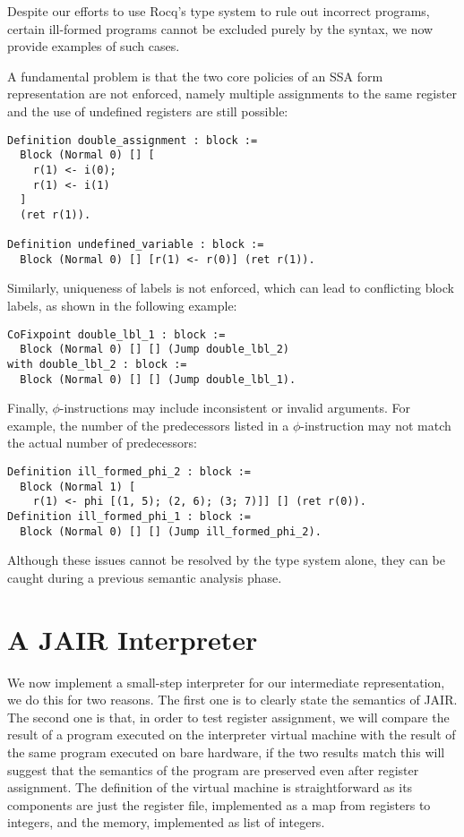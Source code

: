 Despite our efforts to use Rocq's type system to rule out incorrect programs, certain ill-formed programs cannot be excluded purely by the syntax, we now provide examples of such cases.

A fundamental problem is that the two core policies of an SSA form representation are not enforced, namely multiple assignments to the same register and the use of undefined registers are still possible:

\begin{lstlisting}[style=Rocq]
Definition double_assignment : block :=
  Block (Normal 0) [] [
    r(1) <- i(0);
    r(1) <- i(1)
  ]
  (ret r(1)).

Definition undefined_variable : block :=
  Block (Normal 0) [] [r(1) <- r(0)] (ret r(1)).
\end{lstlisting}

Similarly, uniqueness of labels is not enforced, which can lead to conflicting block labels, as shown in the following example:

\begin{lstlisting}[style=Rocq]
CoFixpoint double_lbl_1 : block :=
  Block (Normal 0) [] [] (Jump double_lbl_2)
with double_lbl_2 : block :=
  Block (Normal 0) [] [] (Jump double_lbl_1).
\end{lstlisting}

Finally, $\phi$-instructions may include inconsistent or invalid arguments. For example, the number of the predecessors listed in a $\phi$-instruction may not match the actual number of predecessors:

\begin{lstlisting}[style=Rocq]
Definition ill_formed_phi_2 : block :=
  Block (Normal 1) [
    r(1) <- phi [(1, 5); (2, 6); (3; 7)]] [] (ret r(0)).
Definition ill_formed_phi_1 : block :=
  Block (Normal 0) [] [] (Jump ill_formed_phi_2).
\end{lstlisting}

Although these issues cannot be resolved by the type system alone, they can be caught during a previous semantic analysis phase.

\section{A JAIR Interpreter}
\label{sec:jair-int}

We now implement a small-step interpreter for our intermediate representation, we do this for two reasons.
The first one is to clearly state the semantics of JAIR. The second one is that, in order to test register assignment, we will compare the result of a program executed on the interpreter virtual machine with the result of the same program executed on bare hardware, if the two results match this will suggest that the semantics of the program are preserved even after register assignment.
The definition of the virtual machine is straightforward as its components are just the register file, implemented as a map from registers to integers, and the memory, implemented as list of integers.

